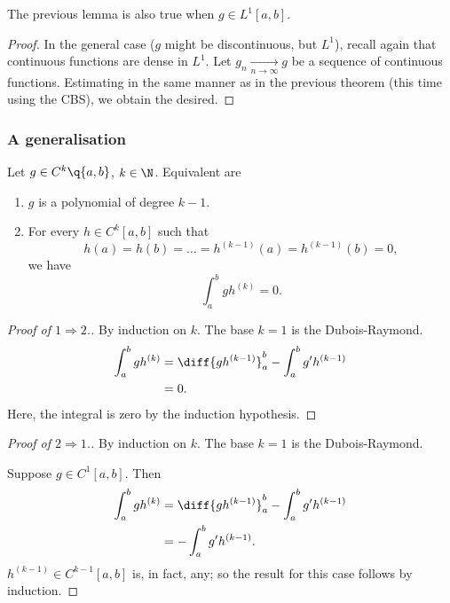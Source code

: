 \begin{lemma}
  The previous lemma is also true when $g \in L^1[a, b]$.
\end{lemma}

\begin{proof}
    In the general case ($g$ might be discontinuous, but $L^1$), recall again that continuous functions are dense in $L^1$.
  Let $g_n \xrightarrow[n\to\infty]{} g$ be a sequence of continuous functions. Estimating in the same manner as in the previous theorem (this time using the CBS), we obtain the desired.
\end{proof}

\subsubsection{A generalisation}

\begin{lemma}
  Let $g \in C^k\q{a,b}$, $k \in \N$.
  Equivalent are
  \begin{enumerate}
    \item $g$ is a polynomial of degree $k-1$.
    \item For every $h \in C^k[a, b]$ such that
      $$ h(a) = h(b) = \dots = h^{(k-1)}(a) = h^{(k-1)}(b) = 0, $$
      we have
      $$ \int_a^b gh^{(k)} = 0. $$
  \end{enumerate}
\end{lemma}

\begin{proof}[Proof of $1 \Rightarrow 2$.]
  By induction on $k$. The base $k = 1$ is the Dubois-Raymond.
  \begin{align*}
    \int_a^b gh^{(k)}
    &= \diff{gh^{(k-1)}}_a^b - \int_a^b g'h^{(k-1)} \\
    &= 0.
  \end{align*}
  Here, the integral is zero by the induction hypothesis.
\end{proof}

\begin{proof}[Proof of $2 \Rightarrow 1$.]
  By induction on $k$. The base $k = 1$ is the Dubois-Raymond.

  Suppose $g \in C^1[a, b]$. Then
  \begin{align*}
    \int_a^b gh^{(k)}
    &= \diff{gh^{(k-1)}}_a^b - \int_a^b g'h^{(k-1)} \\
    &= -\int_a^b g'h^{(k-1)}.
  \end{align*}
  $h^{(k-1)} \in C^{k-1}[a, b]$ is, in fact, any; so the result for this case follows by induction.
\end{proof}

